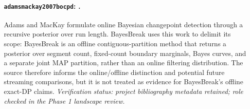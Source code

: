 
\paragraph{\texttt{adamsmackay2007bocpd}: \citet{adamsmackay2007bocpd}.}
Adams and MacKay formulate online Bayesian changepoint detection through a recursive posterior over run length. BayesBreak uses this work to delimit its scope: BayesBreak is an offline contiguous-partition method that returns a posterior over segment count, fixed-count boundary marginals, Bayes curves, and a separate joint MAP partition, rather than an online filtering distribution. The source therefore informs the online/offline distinction and potential future streaming comparisons, but it is not treated as evidence for BayesBreak's offline exact-DP claims. \textit{Verification status: project bibliography metadata retained; role checked in the Phase 1 landscape review.}
